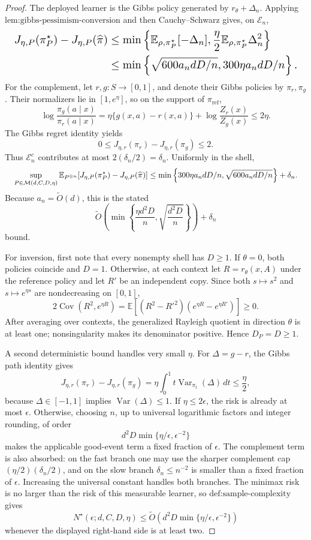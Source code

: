 \documentclass{article}
\begin{document}
\begin{proof}
The deployed learner is the Gibbs policy generated by \(r_\theta+\Delta_n\). Applying \(\text{lem:gibbs-pessimism-conversion}\) and then Cauchy--Schwarz gives, on \(\mathcal E_n\),
\[
\makebox[\linewidth][c]{\resizebox{0.98\linewidth}{!}{\(\displaystyle \begin{aligned}
J_{\eta,P}(\pi_P^\star)-J_{\eta,P}(\widehat\pi)
&\le\min\left\{
\mathbb E_{\rho,\pi_P^\star}[-\Delta_n],
\frac\eta2\mathbb E_{\rho,\pi_P^\star}\Delta_n^2
\right\}\\
&\le\min\left\{
\sqrt{600a_ndD/n},
300\eta a_ndD/n
\right\}.
\end{aligned}\)}}
\]
For the complement, let \(r,g:S\to[0,1]\), and denote their Gibbs policies by \(\pi_r,\pi_g\). Their normalizers lie in \([1,e^\eta]\), so on the support of \(\pi_{\mathrm{ref}}\),
\[
\log\frac{\pi_g(a\mid x)}{\pi_r(a\mid x)}
=\eta\{g(x,a)-r(x,a)\}+\log\frac{Z_r(x)}{Z_g(x)}
\le2\eta.
\]
The Gibbs regret identity yields
\[
0\le J_{\eta,r}(\pi_r)-J_{\eta,r}(\pi_g)\le2.
\]
Thus \(\mathcal E_n^c\) contributes at most \(2(\delta_n/2)=\delta_n\). Uniformly in the shell,
\[
\makebox[\linewidth][c]{\resizebox{0.98\linewidth}{!}{\(\displaystyle \sup_{P\in\mathcal M(d,C,D,\eta)}
\mathbb E_{P^{\otimes n}}[J_{\eta,P}(\pi_P^\star)-J_{\eta,P}(\widehat\pi)]
\le
\min\left\{300\eta a_ndD/n,\sqrt{600a_ndD/n}\right\}+\delta_n.\)}}
\]
Because \(a_n=\widetilde O(d)\), this is the stated
\[
\widetilde O\left(\min\left\{\frac{\eta d^2D}{n},\sqrt{\frac{d^2D}{n}}\right\}\right)+\delta_n
\]
bound.

For inversion, first note that every nonempty shell has \(D\ge1\). If \(\theta=0\), both policies coincide and \(D=1\). Otherwise, at each context let \(R=r_\theta(x,A)\) under the reference policy and let \(R'\) be an independent copy. Since both \(s\mapsto s^2\) and \(s\mapsto e^{\eta s}\) are nondecreasing on \([0,1]\),
\[
2\operatorname{Cov}(R^2,e^{\eta R})
=\mathbb E[(R^2-R'^2)(e^{\eta R}-e^{\eta R'})]\ge0.
\]
After averaging over contexts, the generalized Rayleigh quotient in direction \(\theta\) is at least one; nonsingularity makes its denominator positive. Hence \(D_P=D\ge1\).

A second deterministic bound handles very small \(\eta\). For \(\Delta=g-r\), the Gibbs path identity gives
\[
J_{\eta,r}(\pi_r)-J_{\eta,r}(\pi_g)
=\eta\int_0^1t\operatorname{Var}_{\pi_t}(\Delta)\,dt
\le\frac\eta2,
\]
because \(\Delta\in[-1,1]\) implies \(\operatorname{Var}(\Delta)\le1\). If \(\eta\le2\epsilon\), the risk is already at most \(\epsilon\). Otherwise, choosing \(n\), up to universal logarithmic factors and integer rounding, of order
\[
d^2D\min\{\eta/\epsilon,\epsilon^{-2}\}
\]
makes the applicable good-event term a fixed fraction of \(\epsilon\). The complement term is also absorbed: on the fast branch one may use the sharper complement cap \((\eta/2)(\delta_n/2)\), and on the slow branch \(\delta_n\le n^{-2}\) is smaller than a fixed fraction of \(\epsilon\). Increasing the universal constant handles both branches. The minimax risk is no larger than the risk of this measurable learner, so \(\text{def:sample-complexity}\) gives
\[
N^\star(\epsilon;d,C,D,\eta)
\le\widetilde O\left(d^2D\min\{\eta/\epsilon,\epsilon^{-2}\}\right)
\]
whenever the displayed right-hand side is at least two.


\end{proof}
\end{document}
